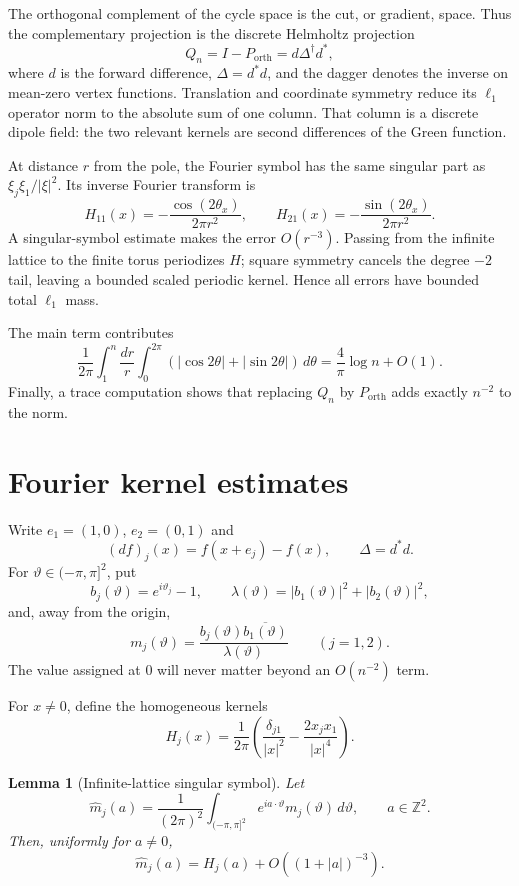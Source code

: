 \documentclass[11pt]{article}
\newtheorem{lemma}[theorem]{Lemma}
\newcommand{\Z}{\mathbb Z}
\newcommand{\orth}{\mathrm{orth}}
\begin{document}
The orthogonal complement of the cycle space is the cut, or gradient,
space.  Thus the complementary projection is the discrete Helmholtz
projection
\[
 Q_n=I-P_{\orth}=d\Delta^\dagger d^*,
\]
where $d$ is the forward difference, $\Delta=d^*d$, and the dagger denotes
the inverse on mean-zero vertex functions.  Translation and coordinate
symmetry reduce its $\ell_1$ operator norm to the absolute sum of one
column.  That column is a discrete dipole field: the two relevant kernels
are second differences of the Green function.

At distance $r$ from the pole, the Fourier symbol has the same singular
part as $\xi_j\xi_1/|\xi|^2$.  Its inverse Fourier transform is
\[
 H_{11}(x)=-\frac{\cos(2\theta_x)}{2\pi r^2},\qquad
 H_{21}(x)=-\frac{\sin(2\theta_x)}{2\pi r^2}.
\]
A singular-symbol estimate makes the error $O(r^{-3})$.  Passing from the
infinite lattice to the finite torus periodizes $H$; square symmetry cancels
the degree $-2$ tail, leaving a bounded scaled periodic kernel.  Hence all
errors have bounded total $\ell_1$ mass.

The main term contributes
\[
 \frac1{2\pi}\int_1^n\frac{dr}{r}
 \int_0^{2\pi}(|\cos2\theta|+|\sin2\theta|)\,d\theta
 =\frac4\pi\log n+O(1).
\]
Finally, a trace computation shows that replacing $Q_n$ by $P_{\orth}$
adds exactly $n^{-2}$ to the norm.

\section{Fourier kernel estimates}

Write $e_1=(1,0)$, $e_2=(0,1)$ and
\[
 (df)_j(x)=f(x+e_j)-f(x),\qquad \Delta=d^*d.
\]
For $\vartheta\in(-\pi,\pi]^2$, put
\[
 b_j(\vartheta)=e^{i\vartheta_j}-1,\qquad
 \lambda(\vartheta)=|b_1(\vartheta)|^2+|b_2(\vartheta)|^2,
\]
and, away from the origin,
\[
 m_j(\vartheta)=\frac{b_j(\vartheta)\overline{b_1(\vartheta)}}
 {\lambda(\vartheta)}\qquad(j=1,2).
\]
The value assigned at $0$ will never matter beyond an $O(n^{-2})$ term.

For $x\ne0$, define the homogeneous kernels
\begin{equation}\label{eq:H}
 H_j(x)=\frac1{2\pi}
 \left(\frac{\delta_{j1}}{|x|^2}-\frac{2x_jx_1}{|x|^4}\right).
\end{equation}

\begin{lemma}[Infinite-lattice singular symbol]\label{lem:infinite}
Let
\[
 \widehat m_j(a)=\frac1{(2\pi)^2}\int_{(-\pi,\pi]^2}
 e^{ia\cdot\vartheta}m_j(\vartheta)\,d\vartheta,
 \qquad a\in\Z^2.
\]
Then, uniformly for $a\ne0$,
\[
 \widehat m_j(a)=H_j(a)+O((1+|a|)^{-3}).
\]
\end{lemma}
\end{document}
